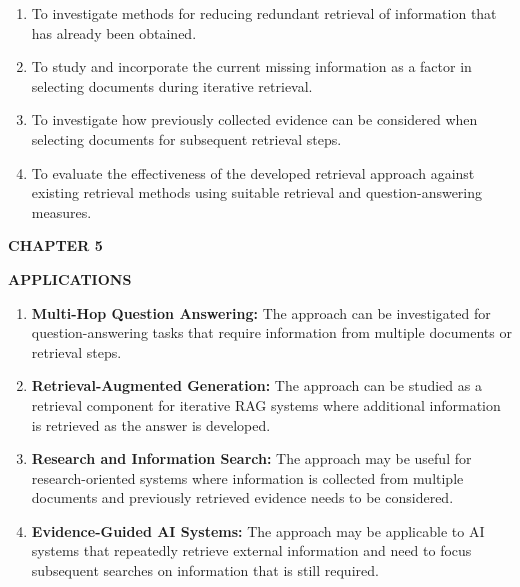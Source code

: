 \documentclass[12pt,a4paper]{report}
\newcommand{\chaptertitle}[2]{
    \begin{center}
        {\fontsize{18}{21}\selectfont\bfseries CHAPTER #1\par}
        \vspace{0.10in}
        {\fontsize{18}{21}\selectfont\bfseries #2\par}
    \end{center}
    \vspace{0.12in}
}
\begin{document}
\begin{enumerate}[
    leftmargin=0.30in,
    itemsep=0.12in,
    parsep=0pt
]

\item
To investigate methods for reducing redundant retrieval of information that has already been obtained.

\item
To study and incorporate the current missing information as a factor in selecting documents during iterative retrieval.

\item
To investigate how previously collected evidence can be considered when selecting documents for subsequent retrieval steps.

\item
To evaluate the effectiveness of the developed retrieval approach against existing retrieval methods using suitable retrieval and question-answering measures.

\end{enumerate}

\clearpage




\chaptertitle{5}{APPLICATIONS}

\begin{enumerate}[
    leftmargin=0.30in,
    itemsep=0.12in
]

\item
\textbf{Multi-Hop Question Answering:}
The approach can be investigated for question-answering tasks that require information from multiple documents or retrieval steps.

\item
\textbf{Retrieval-Augmented Generation:}
The approach can be studied as a retrieval component for iterative RAG systems where additional information is retrieved as the answer is developed.

\item
\textbf{Research and Information Search:}
The approach may be useful for research-oriented systems where information is collected from multiple documents and previously retrieved evidence needs to be considered.

\item
\textbf{Evidence-Guided AI Systems:}
The approach may be applicable to AI systems that repeatedly retrieve external information and need to focus subsequent searches on information that is still required.

\end{enumerate}
\end{document}
